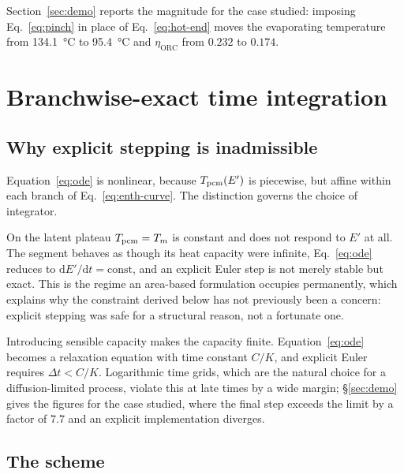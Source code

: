 Section~\ref{sec:demo} reports the magnitude for the case studied: imposing
Eq.~\eqref{eq:pinch} in place of Eq.~\eqref{eq:hot-end} moves the evaporating
temperature from \SI{134.1}{\celsius} to \SI{95.4}{\celsius} and
$\eta_{\mathrm{ORC}}$ from $0.232$ to $0.174$.

\section{Branchwise-exact time integration}
\label{sec:integration}

\subsection{Why explicit stepping is inadmissible}

Equation~\eqref{eq:ode} is nonlinear, because $T_{\mathrm{pcm}}(E')$ is piecewise, but
affine within each branch of Eq.~\eqref{eq:enth-curve}. The distinction governs
the choice of integrator.

On the latent plateau $T_{\mathrm{pcm}}=T_{m}$ is constant and does not respond to $E'$ at
all. The segment behaves as though its heat capacity were infinite,
Eq.~\eqref{eq:ode} reduces to $\mathrm{d}E'/\mathrm{d}t=\text{const}$, and an
explicit Euler step is not merely stable but exact. This is the regime an
area-based formulation occupies permanently, which explains why the constraint
derived below has not previously been a concern: explicit stepping was safe for
a structural reason, not a fortunate one.

Introducing sensible capacity makes the capacity finite. Equation~\eqref{eq:ode}
becomes a relaxation equation with time constant $C/K$, and explicit Euler
requires $\Delta t < C/K$. Logarithmic time grids, which are the natural choice
for a diffusion-limited process, violate this at late times by a wide margin;
\S\ref{sec:demo} gives the figures for the case studied, where the final step
exceeds the limit by a factor of $7.7$ and an explicit implementation diverges.

\subsection{The scheme}

